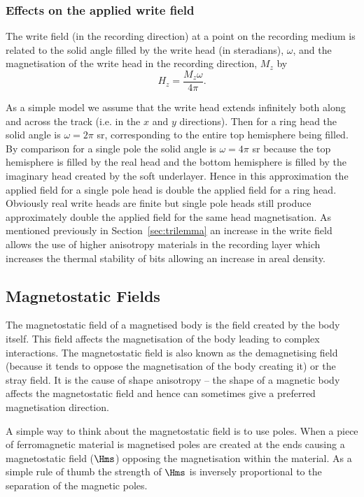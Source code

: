 \subsubsection{Effects on the applied write field}

The write field (in the recording direction) at a point on the recording medium
is related to the solid angle filled by the write head (in steradians),
$\omega$, and the magnetisation of the write head in the recording direction,
$M_{z}$ by\cite{Richter2007a}
\[ H_{z}=\dfrac{M_{z} \omega}{4\pi}.\]

As a simple model we assume that the write head extends infinitely both along
and across the track (i.e. in the $x$ and $y$ directions). Then for a ring head
the solid angle is $\omega=2\pi$ sr, corresponding to the entire top hemisphere
being filled. By comparison for a single pole the solid angle is $\omega=4\pi$
sr because the top hemisphere is filled by the real head and the bottom
hemisphere is filled by the imaginary head created by the soft underlayer. Hence
in this approximation the applied field for a single pole head is double the
applied field for a ring head. Obviously real write heads are finite but single
pole heads still produce approximately double the applied field for the same
head magnetisation.\cite{Khizroev2004a} As mentioned previously in
Section~\ref{sec:trilemma} an increase in the write field allows the use of
higher anisotropy materials in the recording layer which increases the thermal
stability of bits allowing an increase in areal density.


\subsection{Magnetostatic Fields}

The magnetostatic field of a magnetised body is the field created by the body
itself. This field affects the magnetisation of the body leading to complex
interactions. The magnetostatic field is also known as the demagnetising field
(because it tends to oppose the magnetisation of the body creating it) or the
stray field. It is the cause of shape anisotropy -- the shape of a magnetic body
affects the magnetostatic field and hence can sometimes give a preferred
magnetisation direction.

A simple way to think about the magnetostatic field is to use poles. When a
piece of ferromagnetic material is magnetised poles are created at the ends
causing a magnetostatic field ($\Hms$) opposing the magnetisation within the
material. As a simple rule of thumb the strength of $\Hms$ is inversely
proportional to the separation of the magnetic poles. \cite{Piramanayagam2007a}

